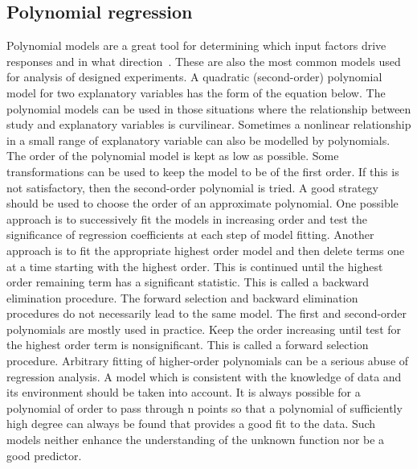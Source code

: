 \subsection{Polynomial regression} \label{sec:poly}
Polynomial models are a great tool for determining which input factors drive responses and in what direction~\cite{poly}.
These are also the most common models used for analysis of designed experiments.
A quadratic (second-order) polynomial model for two explanatory variables has the form of the equation below.
The polynomial models can be used in those situations where the relationship between study and explanatory variables is curvilinear.
Sometimes a nonlinear relationship in a small range of explanatory variable can also be modelled by polynomials.
The order of the polynomial model is kept as low as possible.
Some transformations can be used to keep the model to be of the first order.
If this is not satisfactory, then the second-order polynomial is tried.
A good strategy should be used to choose the order of an approximate polynomial.
One possible approach is to successively fit the models in increasing order and test the significance of regression coefficients at each step of model fitting.
Another approach is to fit the appropriate highest order model and then delete terms one at a time starting with the highest order.
This is continued until the highest order remaining term has a significant statistic.
This is called a backward elimination procedure.
The forward selection and backward elimination procedures do not necessarily lead to the same model.
The first and second-order polynomials are mostly used in practice.
Keep the order increasing until test for the highest order term is nonsignificant.
This is called a forward selection procedure.
Arbitrary fitting of higher-order polynomials can be a serious abuse of regression analysis.
A model which is consistent with the knowledge of data and its environment should be taken into account.
It is always possible for a polynomial of order to pass
through n points so that a polynomial of sufficiently high degree can always be found that provides
a good fit to the data.
Such models neither enhance the understanding of the unknown function nor be a good predictor.
